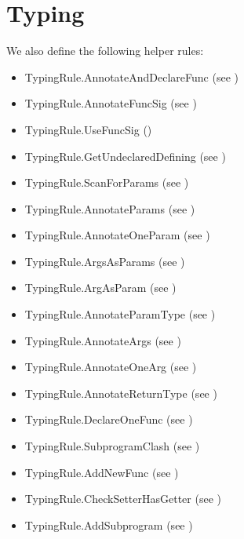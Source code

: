 \section{Typing}

We also define the following helper rules:
\begin{itemize}
  \item TypingRule.AnnotateAndDeclareFunc (see )
  \item TypingRule.AnnotateFuncSig (see )
  \item TypingRule.UseFuncSig ()
  \item TypingRule.GetUndeclaredDefining (see )
  \item TypingRule.ScanForParams (see )
  \item TypingRule.AnnotateParams (see )
  \item TypingRule.AnnotateOneParam (see )
  \item TypingRule.ArgsAsParams (see )
  \item TypingRule.ArgAsParam (see )
  \item TypingRule.AnnotateParamType (see )
  \item TypingRule.AnnotateArgs (see )
  \item TypingRule.AnnotateOneArg (see )
  \item TypingRule.AnnotateReturnType (see )
  \item TypingRule.DeclareOneFunc (see )
  \item TypingRule.SubprogramClash (see )
  \item TypingRule.AddNewFunc (see )
  \item TypingRule.CheckSetterHasGetter (see )
  \item TypingRule.AddSubprogram (see )
\end{itemize}

